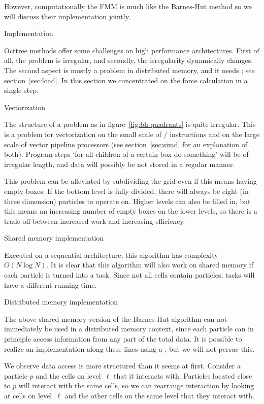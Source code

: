 However, computationally the \ac{FMM} is much like the Barnes-Hut
method so we will discuss their implementation jointly.

 {Implementation}

Octtree methods offer some challenges on high performance
architectures. First of all, the problem is irregular, and secondly,
the irregularity dynamically changes. The second aspect is mostly a
problem in distributed memory, and it
needs ; see section~\ref{sec:load}. In
this section we concentrated on the force calculation in a single
step.

 {Vectorization}

The structure of a problem as in figure~\ref{fig:bh-quadrants} is
quite irregular. This is a problem for vectorization on the small
scale of / instructions and on the large
scale of vector pipeline processors (see section~\ref{sec:simd} for an
explanation of both). Program steps `for all children of a certain box
do something' will be of irregular length, and data will possibly be
not stored in a regular manner.

This problem can be alleviated by subdividing the grid even if this
means having empty boxes. If the bottom level is fully divided, there
will always be eight (in three dimension) particles to operate
on. Higher levels can also be filled in, but this means an increasing
number of empty boxes on the lower levels, so there is a trade-off
between increased work and increasing efficiency.

 {Shared memory implementation}

Executed on a sequential architecture, this algorithm has complexity
$O(N\log N)$. It is clear that this algorithm will also work on shared
memory if each particle is turned into a task. Since not all cells
contain particles, tasks will have a different running time.

 {Distributed memory implementation}

The above shared-memory version of the Barnes-Hut algorithm can not
immediately be used in a distributed memory context, since each
particle can in principle access information from any part of the
total data. It is possible to realize an implementation along these
lines using a , but we will not persue
this.

We observe data access is more structured than it seems at
first. Consider a particle $p$ and the cells on level~$\ell$ that it
interacts with. Particles located close to $p$ will interact with the
same cells, so we can rearrange interaction by looking at cells on
level~$\ell$ and the other cells on the same level that they interact
with.

